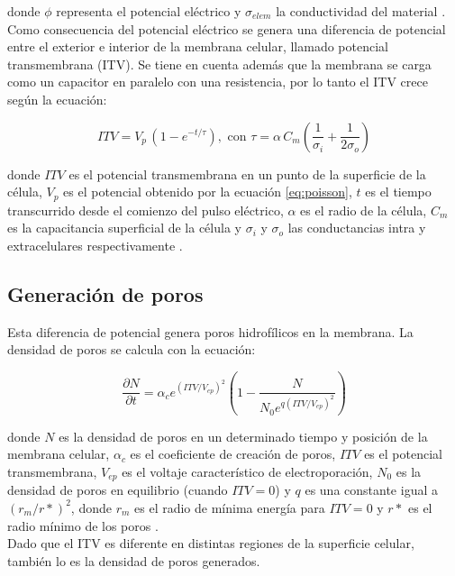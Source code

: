 \documentclass[a4paper,10pt]{article}
\begin{document}
donde $\phi$ representa el potencial eléctrico y $\sigma_{elem}$ la conductividad del material \cite[p.~88]{fem-electro}.\\

Como consecuencia del potencial eléctrico se genera una diferencia de potencial entre el exterior e interior de la membrana celular, llamado potencial transmembrana (ITV). Se tiene en cuenta además que la membrana se carga como un capacitor en paralelo con una resistencia, por lo tanto el ITV crece según la ecuación:


\begin{equation} \label{eq:capacit} 
	ITV = V_p\, (1 - e^{-t/\tau}) , \textrm{ con } \tau = \alpha\, C_m \left( \frac{1}{\sigma_i} + \frac{1}{2 \sigma_o} \right)
\end{equation}

donde $ITV$ es el potencial transmembrana en un punto de la superficie de la célula, $V_p$ es el potencial obtenido por la ecuación \eqref{eq:poisson}, $t$ es el tiempo transcurrido desde el comienzo del pulso eléctrico, $\alpha$ es el radio de la célula, $C_m$ es la capacitancia superficial de la célula y $\sigma_i$ y $\sigma_o$ las conductancias intra y extracelulares respectivamente \cite{krass}.\\


\subsection{Generación de poros}
Esta diferencia de potencial genera poros hidrofílicos en la membrana. La densidad de poros se calcula con la ecuación:

\begin{equation} \label{eq:poros-crea}
	\frac{\partial N}{\partial t} = \alpha_c e^{(ITV/V_{ep})^2} \left( 1 - \frac{N}{N_0 e^{q \left(ITV/V_{ep} \right) ^2}} \right)
\end{equation}

donde $N$ es la densidad de poros en un determinado tiempo y posición de la membrana celular, $\alpha_c$ es el coeficiente de creación de poros, $ITV$ es el potencial transmembrana, $V_{ep}$ es el voltaje característico de electroporación, $N_0$ es la densidad de poros en equilibrio (cuando $ITV = 0$) y $q$ es una constante igual a $(r_m / r*)^2$, donde $r_m$ es el radio de mínima energía para $ITV = 0$ y $r*$ es el radio mínimo de los poros \cite{krass}.\\

Dado que el ITV es diferente en distintas regiones de la superficie celular, también lo es la densidad de poros generados.
\end{document}
